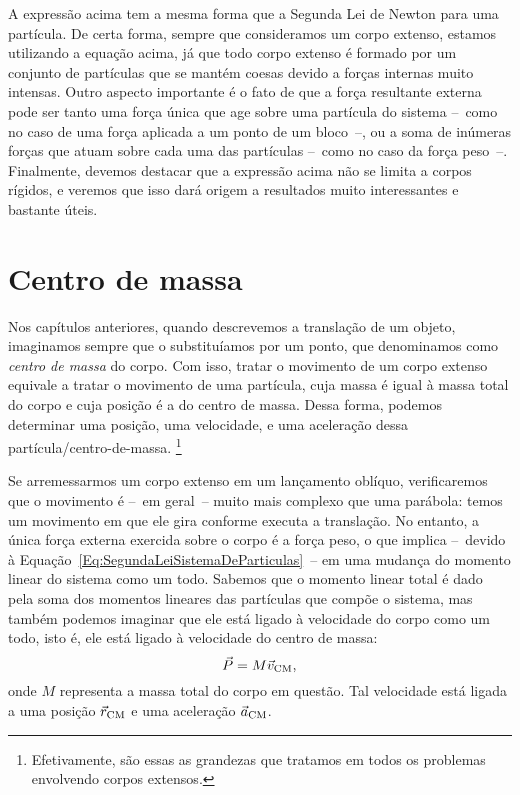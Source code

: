 A expressão acima tem a mesma forma que a Segunda Lei de Newton para uma partícula. De certa forma, sempre que consideramos um corpo extenso, estamos utilizando a equação acima, já que todo corpo extenso é formado por um conjunto de partículas que se mantém coesas devido a forças internas muito intensas. Outro aspecto importante é o fato de que a força resultante externa pode ser tanto uma força única que age sobre uma partícula do sistema --~como no caso de uma força aplicada a um ponto de um bloco~--, ou a soma de inúmeras forças que atuam sobre cada uma das partículas --~como no caso da força peso~--. Finalmente, devemos destacar que a expressão acima não se limita a corpos rígidos, e veremos que isso dará origem a resultados muito interessantes e bastante úteis.


\section{Centro de massa}

Nos capítulos anteriores, quando descrevemos a translação de um objeto, imaginamos sempre que o substituíamos por um ponto, que denominamos como \emph{centro de massa} do corpo. Com isso, tratar o movimento de um corpo extenso equivale a tratar o movimento de uma partícula, cuja massa é igual à massa total do corpo e cuja posição é a do centro de massa. Dessa forma, podemos determinar uma posição, uma velocidade, e uma aceleração dessa partícula/centro-de-massa. \footnote{Efetivamente, são essas as grandezas que tratamos em todos os problemas envolvendo corpos extensos.}

Se arremessarmos um corpo extenso em um lançamento oblíquo, verificaremos que o movimento é --~em geral~-- muito mais complexo que uma parábola: temos um movimento em que ele gira conforme executa a translação. No entanto, a única força externa exercida sobre o corpo é a força peso, o que implica --~devido à Equação~\ref{Eq:SegundaLeiSistemaDeParticulas}~-- em uma mudança do momento linear do sistema como um todo. Sabemos que o momento linear total é dado pela soma dos momentos lineares das partículas que compõe o sistema, mas também podemos imaginar que ele está ligado à velocidade do corpo como um todo, isto é, ele está ligado à velocidade do centro de massa:
\begin{equation}
    \vec{P} = M \vec{v}_{\rm{CM}},
\end{equation}
%
onde $M$ representa a massa total do corpo em questão. Tal velocidade está ligada a uma posição $\vec{r}_{\rm{CM}}$ e uma aceleração $\vec{a}_{\rm{CM}}$.

